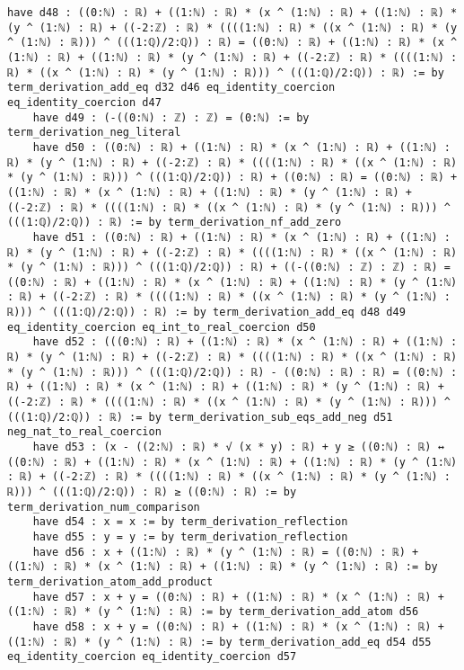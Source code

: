 \documentclass{article}
\begin{document}
\begin{tcolorbox}[colback=white!10, width=\linewidth]
\begin{lstlisting}[language=Lean4]
    have d48 : ((0:ℕ) : ℝ) + ((1:ℕ) : ℝ) * (x ^ (1:ℕ) : ℝ) + ((1:ℕ) : ℝ) * (y ^ (1:ℕ) : ℝ) + ((-2:ℤ) : ℝ) * ((((1:ℕ) : ℝ) * ((x ^ (1:ℕ) : ℝ) * (y ^ (1:ℕ) : ℝ))) ^ (((1:ℚ)/2:ℚ)) : ℝ) = ((0:ℕ) : ℝ) + ((1:ℕ) : ℝ) * (x ^ (1:ℕ) : ℝ) + ((1:ℕ) : ℝ) * (y ^ (1:ℕ) : ℝ) + ((-2:ℤ) : ℝ) * ((((1:ℕ) : ℝ) * ((x ^ (1:ℕ) : ℝ) * (y ^ (1:ℕ) : ℝ))) ^ (((1:ℚ)/2:ℚ)) : ℝ) := by term_derivation_add_eq d32 d46 eq_identity_coercion eq_identity_coercion d47
    have d49 : (-((0:ℕ) : ℤ) : ℤ) = (0:ℕ) := by term_derivation_neg_literal
    have d50 : ((0:ℕ) : ℝ) + ((1:ℕ) : ℝ) * (x ^ (1:ℕ) : ℝ) + ((1:ℕ) : ℝ) * (y ^ (1:ℕ) : ℝ) + ((-2:ℤ) : ℝ) * ((((1:ℕ) : ℝ) * ((x ^ (1:ℕ) : ℝ) * (y ^ (1:ℕ) : ℝ))) ^ (((1:ℚ)/2:ℚ)) : ℝ) + ((0:ℕ) : ℝ) = ((0:ℕ) : ℝ) + ((1:ℕ) : ℝ) * (x ^ (1:ℕ) : ℝ) + ((1:ℕ) : ℝ) * (y ^ (1:ℕ) : ℝ) + ((-2:ℤ) : ℝ) * ((((1:ℕ) : ℝ) * ((x ^ (1:ℕ) : ℝ) * (y ^ (1:ℕ) : ℝ))) ^ (((1:ℚ)/2:ℚ)) : ℝ) := by term_derivation_nf_add_zero
    have d51 : ((0:ℕ) : ℝ) + ((1:ℕ) : ℝ) * (x ^ (1:ℕ) : ℝ) + ((1:ℕ) : ℝ) * (y ^ (1:ℕ) : ℝ) + ((-2:ℤ) : ℝ) * ((((1:ℕ) : ℝ) * ((x ^ (1:ℕ) : ℝ) * (y ^ (1:ℕ) : ℝ))) ^ (((1:ℚ)/2:ℚ)) : ℝ) + ((-((0:ℕ) : ℤ) : ℤ) : ℝ) = ((0:ℕ) : ℝ) + ((1:ℕ) : ℝ) * (x ^ (1:ℕ) : ℝ) + ((1:ℕ) : ℝ) * (y ^ (1:ℕ) : ℝ) + ((-2:ℤ) : ℝ) * ((((1:ℕ) : ℝ) * ((x ^ (1:ℕ) : ℝ) * (y ^ (1:ℕ) : ℝ))) ^ (((1:ℚ)/2:ℚ)) : ℝ) := by term_derivation_add_eq d48 d49 eq_identity_coercion eq_int_to_real_coercion d50
    have d52 : (((0:ℕ) : ℝ) + ((1:ℕ) : ℝ) * (x ^ (1:ℕ) : ℝ) + ((1:ℕ) : ℝ) * (y ^ (1:ℕ) : ℝ) + ((-2:ℤ) : ℝ) * ((((1:ℕ) : ℝ) * ((x ^ (1:ℕ) : ℝ) * (y ^ (1:ℕ) : ℝ))) ^ (((1:ℚ)/2:ℚ)) : ℝ) - ((0:ℕ) : ℝ) : ℝ) = ((0:ℕ) : ℝ) + ((1:ℕ) : ℝ) * (x ^ (1:ℕ) : ℝ) + ((1:ℕ) : ℝ) * (y ^ (1:ℕ) : ℝ) + ((-2:ℤ) : ℝ) * ((((1:ℕ) : ℝ) * ((x ^ (1:ℕ) : ℝ) * (y ^ (1:ℕ) : ℝ))) ^ (((1:ℚ)/2:ℚ)) : ℝ) := by term_derivation_sub_eqs_add_neg d51 neg_nat_to_real_coercion
    have d53 : (x - ((2:ℕ) : ℝ) * √ (x * y) : ℝ) + y ≥ ((0:ℕ) : ℝ) ↔ ((0:ℕ) : ℝ) + ((1:ℕ) : ℝ) * (x ^ (1:ℕ) : ℝ) + ((1:ℕ) : ℝ) * (y ^ (1:ℕ) : ℝ) + ((-2:ℤ) : ℝ) * ((((1:ℕ) : ℝ) * ((x ^ (1:ℕ) : ℝ) * (y ^ (1:ℕ) : ℝ))) ^ (((1:ℚ)/2:ℚ)) : ℝ) ≥ ((0:ℕ) : ℝ) := by term_derivation_num_comparison
    have d54 : x = x := by term_derivation_reflection
    have d55 : y = y := by term_derivation_reflection
    have d56 : x + ((1:ℕ) : ℝ) * (y ^ (1:ℕ) : ℝ) = ((0:ℕ) : ℝ) + ((1:ℕ) : ℝ) * (x ^ (1:ℕ) : ℝ) + ((1:ℕ) : ℝ) * (y ^ (1:ℕ) : ℝ) := by term_derivation_atom_add_product
    have d57 : x + y = ((0:ℕ) : ℝ) + ((1:ℕ) : ℝ) * (x ^ (1:ℕ) : ℝ) + ((1:ℕ) : ℝ) * (y ^ (1:ℕ) : ℝ) := by term_derivation_add_atom d56
    have d58 : x + y = ((0:ℕ) : ℝ) + ((1:ℕ) : ℝ) * (x ^ (1:ℕ) : ℝ) + ((1:ℕ) : ℝ) * (y ^ (1:ℕ) : ℝ) := by term_derivation_add_eq d54 d55 eq_identity_coercion eq_identity_coercion d57

\end{lstlisting}
\end{tcolorbox}
\end{document}
